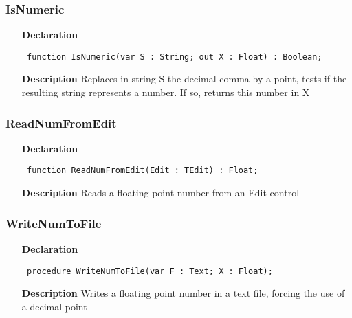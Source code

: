 \documentclass[12pt,a4paper,oneside]{report}
\newcommand{\declarationitem}[1]{\textbf{#1}}
\newcommand{\descriptiontitle}[1]{\textbf{#1}}
\newcommand{\code}[1]{\texttt{#1}}
\begin{document}
\subsubsection{IsNumeric}
\label{uwinstr-IsNumeric}
\begin{itemize}\item[\declarationitem{Declaration}\hfill]
	\begin{flushleft}
		\code{
			function IsNumeric(var S : String; out X : Float) : Boolean;}
		
	\end{flushleft}
	
	\par
	\item[\descriptiontitle{Description}]
	Replaces in string S the decimal comma by a point, tests if the resulting string represents a number. If so, returns this number in X
	
\end{itemize}
\subsubsection{ReadNumFromEdit}
\label{uwinstr-ReadNumFromEdit}
\begin{itemize}\item[\declarationitem{Declaration}\hfill]
	\begin{flushleft}
		\code{
			function ReadNumFromEdit(Edit : TEdit) : Float;}
		
	\end{flushleft}
	
	\par
	\item[\descriptiontitle{Description}]
	Reads a floating point number from an Edit control
	
\end{itemize}
\subsubsection{WriteNumToFile}
\label{uwinstr-WriteNumToFile}
\begin{itemize}\item[\declarationitem{Declaration}\hfill]
	\begin{flushleft}
		\code{
			procedure WriteNumToFile(var F : Text; X : Float);}
		
	\end{flushleft}
	
	\par
	\item[\descriptiontitle{Description}]
	Writes a floating point number in a text file, forcing the use of a decimal point
	
\end{itemize}
\end{document}
